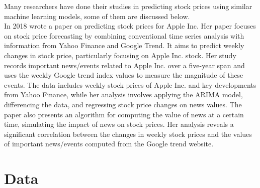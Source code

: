 \documentclass[conference,onecolumn,11pt]{IEEEtran}
\begin{document}
Many researchers have done their studies in predicting stock prices using similar  machine learning models, some of them are discussed below. \\
In 2018 \citeauthor{Xu2018} wrote a paper on predicting stock prices for Apple Inc. Her paper focuses on stock price forecasting by combining conventional time series analysis with information from Yahoo Finance and Google Trend. It aims to predict weekly changes in stock price, particularly focusing on Apple Inc. stock. Her study records important news/events related to Apple Inc. over a five-year span and uses the weekly Google trend index values to measure the magnitude of these events. The data includes weekly stock prices of Apple Inc. and key developments from Yahoo Finance, while her analysis involves applying the ARIMA model, differencing the data, and regressing stock price changes on news values. The paper also presents an algorithm for computing the value of news at a certain time, simulating the impact of news on stock prices. Her analysis reveals a significant correlation between the changes in weekly stock prices and the values of important news/events computed from the Google trend website.\\



\section{Data}

  
\end{document}
